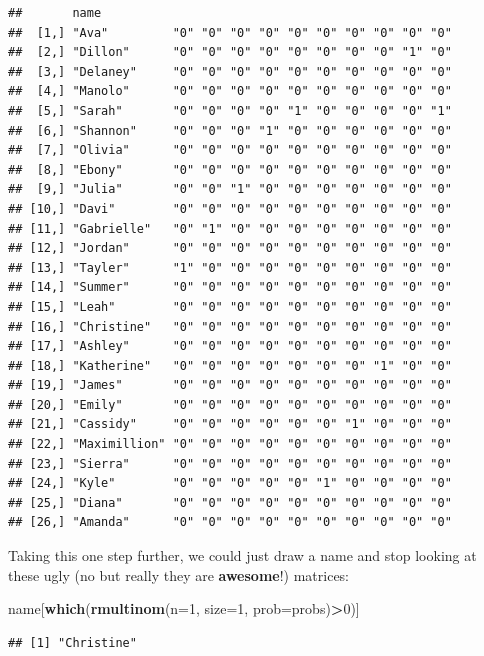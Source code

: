 \documentclass[
]{book}
\newenvironment{Shaded}{\begin{snugshade}}{\end{snugshade}}
\newcommand{\DataTypeTok}[1]{\textcolor[rgb]{0.13,0.29,0.53}{#1}}
\newcommand{\DecValTok}[1]{\textcolor[rgb]{0.00,0.00,0.81}{#1}}
\newcommand{\KeywordTok}[1]{\textcolor[rgb]{0.13,0.29,0.53}{\textbf{#1}}}
\newcommand{\NormalTok}[1]{#1}
\newcommand{\OperatorTok}[1]{\textcolor[rgb]{0.81,0.36,0.00}{\textbf{#1}}}
\begin{document}
\begin{verbatim}
##       name                                                 
##  [1,] "Ava"         "0" "0" "0" "0" "0" "0" "0" "0" "0" "0"
##  [2,] "Dillon"      "0" "0" "0" "0" "0" "0" "0" "0" "1" "0"
##  [3,] "Delaney"     "0" "0" "0" "0" "0" "0" "0" "0" "0" "0"
##  [4,] "Manolo"      "0" "0" "0" "0" "0" "0" "0" "0" "0" "0"
##  [5,] "Sarah"       "0" "0" "0" "0" "1" "0" "0" "0" "0" "1"
##  [6,] "Shannon"     "0" "0" "0" "1" "0" "0" "0" "0" "0" "0"
##  [7,] "Olivia"      "0" "0" "0" "0" "0" "0" "0" "0" "0" "0"
##  [8,] "Ebony"       "0" "0" "0" "0" "0" "0" "0" "0" "0" "0"
##  [9,] "Julia"       "0" "0" "1" "0" "0" "0" "0" "0" "0" "0"
## [10,] "Davi"        "0" "0" "0" "0" "0" "0" "0" "0" "0" "0"
## [11,] "Gabrielle"   "0" "1" "0" "0" "0" "0" "0" "0" "0" "0"
## [12,] "Jordan"      "0" "0" "0" "0" "0" "0" "0" "0" "0" "0"
## [13,] "Tayler"      "1" "0" "0" "0" "0" "0" "0" "0" "0" "0"
## [14,] "Summer"      "0" "0" "0" "0" "0" "0" "0" "0" "0" "0"
## [15,] "Leah"        "0" "0" "0" "0" "0" "0" "0" "0" "0" "0"
## [16,] "Christine"   "0" "0" "0" "0" "0" "0" "0" "0" "0" "0"
## [17,] "Ashley"      "0" "0" "0" "0" "0" "0" "0" "0" "0" "0"
## [18,] "Katherine"   "0" "0" "0" "0" "0" "0" "0" "1" "0" "0"
## [19,] "James"       "0" "0" "0" "0" "0" "0" "0" "0" "0" "0"
## [20,] "Emily"       "0" "0" "0" "0" "0" "0" "0" "0" "0" "0"
## [21,] "Cassidy"     "0" "0" "0" "0" "0" "0" "1" "0" "0" "0"
## [22,] "Maximillion" "0" "0" "0" "0" "0" "0" "0" "0" "0" "0"
## [23,] "Sierra"      "0" "0" "0" "0" "0" "0" "0" "0" "0" "0"
## [24,] "Kyle"        "0" "0" "0" "0" "0" "1" "0" "0" "0" "0"
## [25,] "Diana"       "0" "0" "0" "0" "0" "0" "0" "0" "0" "0"
## [26,] "Amanda"      "0" "0" "0" "0" "0" "0" "0" "0" "0" "0"
\end{verbatim}

Taking this one step further, we could just draw a name and stop looking at these ugly (no but really they are \textbf{awesome}!) matrices:

\begin{Shaded}
\begin{Highlighting}[]
\NormalTok{name[}\KeywordTok{which}\NormalTok{(}\KeywordTok{rmultinom}\NormalTok{(}\DataTypeTok{n=}\DecValTok{1}\NormalTok{, }\DataTypeTok{size=}\DecValTok{1}\NormalTok{, }\DataTypeTok{prob=}\NormalTok{probs)}\OperatorTok{>}\DecValTok{0}\NormalTok{)]}
\end{Highlighting}
\end{Shaded}

\begin{verbatim}
## [1] "Christine"
\end{verbatim}
\end{document}
